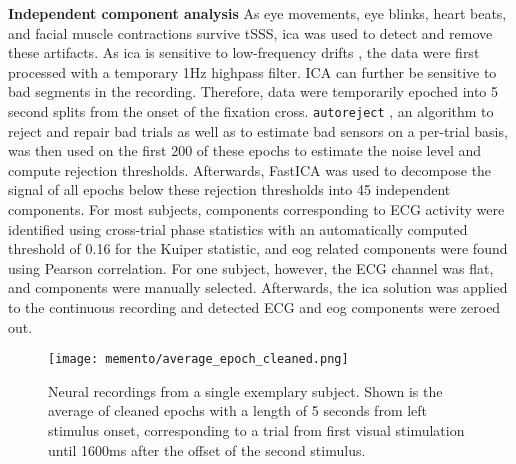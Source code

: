 \textbf{Independent component analysis} As eye movements, eye blinks, heart beats, and facial muscle contractions survive \gls{tSSS}, \gls{ica} was used to detect and remove these artifacts.
As \gls{ica} is sensitive to low-frequency drifts \citep{winkler2015ICA}, the data were first processed with a temporary 1Hz highpass filter. %
ICA can further be sensitive to bad segments in the recording.
Therefore, data were temporarily epoched into 5 second splits from the onset of the fixation cross.
\texttt{autoreject} \citet{jas2017autoreject}, an algorithm to reject and repair bad trials as well as to estimate bad sensors on a per-trial basis, was then used on the first 200 of these epochs to estimate the noise level and compute rejection thresholds.
Afterwards, FastICA \citep{hyvarinen1999fast} was used to decompose the signal of all epochs below these rejection thresholds into 45 independent components.
For most subjects, components corresponding to ECG activity were identified using cross-trial phase statistics \citep{dammers2008integration} with an automatically computed threshold of 0.16 for the Kuiper statistic, and \gls{eog} related components were found using Pearson correlation.
For one subject, however, the ECG channel was flat, and components were manually selected.
Afterwards, the \gls{ica} solution was applied to the continuous recording and detected ECG and \gls{eog} components were zeroed out.

\begin{figure}
	\texttt{[image: memento/average\_epoch\_cleaned.png]}
	\caption[Average neural signal over the trial course]{Neural recordings from a single exemplary subject.
		Shown is the average of cleaned epochs with a length of 5 seconds from left stimulus onset, corresponding to a trial from first visual stimulation until
		1600ms after the offset of the second stimulus.}
	\label{fig:cleanepoch}
\end{figure}

